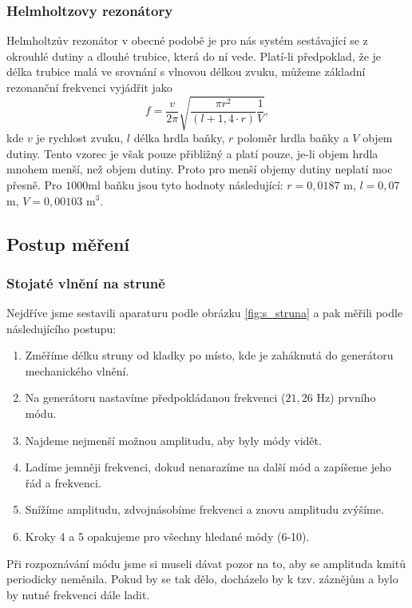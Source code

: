 \documentclass[english]{article}
\begin{document}
	\subsubsection{Helmholtzovy rezonátory}
		Helmholtzův rezonátor v obecné podobě je pro nás systém sestávající se z okrouhlé dutiny a dlouhé trubice, která do ní vede. Platí-li předpoklad, že je délka trubice malá ve srovnání s vlnovou délkou zvuku, můžeme základní rezonanční frekvenci vyjádřit jako 
		\begin{equation}
		f = \frac{v}{2 \pi}\sqrt{\frac{\pi r^2}{(l + 1,4\cdot r)} \frac{1}{V}},
		\label{eq:helm}
		\end{equation}
		kde $v$ je rychlost zvuku, $l$ délka hrdla baňky, $r$ poloměr hrdla baňky a $V$ objem dutiny. Tento vzorec je však pouze přibližný a platí pouze, je-li objem hrdla mnohem menší, než objem dutiny. Proto pro menší objemy dutiny neplatí moc přesně.  Pro $1000$ml baňku jsou tyto hodnoty následující: $r = 0,0187$ m, $l = 0,07$ m, $V = 0,00103$ m$^3$.

\subsection{Postup měření}
	\subsubsection{Stojaté vlnění na struně}
		Nejdříve jsme sestavili aparaturu podle obrázku \ref{fig:s_struna} a pak měřili podle následujícího postupu:
		\begin{enumerate}
			\item Změříme délku struny od kladky po místo, kde je zaháknutá do generátoru mechanického vlnění.
			\item Na generátoru nastavíme předpokládanou frekvenci ($21,26$ Hz) prvního módu.
			\item Najdeme nejmenší možnou amplitudu, aby byly módy vidět.
			\item Ladíme jemněji frekvenci, dokud nenarazíme na další mód a zapíšeme jeho řád a frekvenci.
			\item Snížíme amplitudu, zdvojnásobíme frekvenci a znovu amplitudu zvýšíme.
			\item Kroky 4 a 5 opakujeme pro všechny hledané módy (6-10).   
		\end{enumerate}
		Při rozpoznávání módu jsme si museli dávat pozor na to, aby se amplituda kmitů periodicky neměnila. Pokud by se tak dělo, docházelo by k tzv. záznějům a bylo by nutné frekvenci dále ladit. 
		
\end{document}
